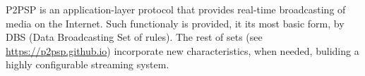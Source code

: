 P2PSP is an application-layer protocol that provides real-time
broadcasting of media on the Internet. Such functionaly is provided,
it its most basic form, by DBS (Data Broadcasting Set of rules). The
rest of sets (see \url{https://p2psp.github.io}) incorporate new
characteristics, when needed, buliding a highly configurable streaming
system.
